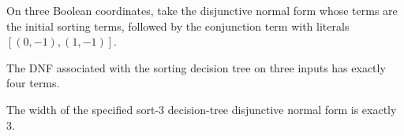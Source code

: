 \begin{definition}
\label{FABL.sort3DecisionTreeDNF}
\leanok
{}
On three Boolean coordinates, take the disjunctive normal form whose terms are the
initial sorting terms, followed by the conjunction term with literals $[(0,-1),(1,-1)]$.
\end{definition}

\begin{theorem}
\label{FABL.size_sort3DecisionTreeDNF}
\leanok
{}
The DNF associated with the sorting decision tree on three inputs has exactly four
terms.
\end{theorem}

\begin{theorem}
\label{FABL.width_sort3DecisionTreeDNF}
\leanok
{}
The width of the specified sort-3 decision-tree disjunctive normal form is exactly $3$.
\end{theorem}

